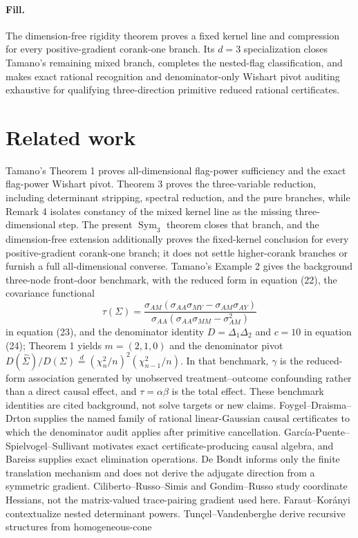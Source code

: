 \documentclass{article}
\begin{document}
\paragraph{Fill.} The dimension-free rigidity theorem proves a fixed kernel line and compression for every positive-gradient corank-one branch. Its \(d=3\) specialization closes Tamano's remaining mixed branch, completes the nested-flag classification, and makes exact rational recognition and denominator-only Wishart pivot auditing exhaustive for qualifying three-direction primitive reduced rational certificates.

\section{Related work}

Tamano's Theorem 1 \cite{Tamano2026SelfNormalizing} proves all-dimensional flag-power sufficiency and the exact flag-power Wishart pivot. Theorem 3 proves the three-variable reduction, including determinant stripping, spectral reduction, and the pure branches, while Remark 4 isolates constancy of the mixed kernel line as the missing three-dimensional step. The present \(\operatorname{Sym}_3\) theorem closes that branch, and the dimension-free extension additionally proves the fixed-kernel conclusion for every positive-gradient corank-one branch; it does not settle higher-corank branches or furnish a full all-dimensional converse. Tamano's Example 2 gives the background three-node front-door benchmark, with the reduced form in equation (22), the covariance functional \[\tau(\Sigma)=\frac{\sigma_{AM}(\sigma_{AA}\sigma_{MY}-\sigma_{AM}\sigma_{AY})}{\sigma_{AA}(\sigma_{AA}\sigma_{MM}-\sigma_{AM}^{2})}\] in equation (23), and the denominator identity \(D=\Delta_1\Delta_2\) and \(c=10\) in equation (24); Theorem 1 yields \(m=(2,1,0)\) and the denominator pivot \(D(\widehat\Sigma)/D(\Sigma)\stackrel{d}{=}(\chi_n^2/n)^2(\chi_{n-1}^2/n)\). In that benchmark, \(\gamma\) is the reduced-form association generated by unobserved treatment--outcome confounding rather than a direct causal effect, and \(\tau=\alpha\beta\) is the total effect. These benchmark identities are cited background, not solve targets or new claims. Foygel--Draisma--Drton \cite{FoygelDraismaDrton2012HalfTrek} supplies the named family of rational linear-Gaussian causal certificates to which the denominator audit applies after primitive cancellation. García-Puente--Spielvogel--Sullivant \cite{GarciaPuenteSpielvogelSullivant2010ComputerAlgebra} motivates exact certificate-producing causal algebra, and Bareiss \cite{Bareiss1968SylvesterIdentity} supplies exact elimination operations. De Bondt \cite{DeBondt2017QuasiTranslations} informs only the finite translation mechanism and does not derive the adjugate direction from a symmetric gradient. Ciliberto--Russo--Simis \cite{CilibertoRussoSimis2008Homaloidal} and Gondim--Russo \cite{GondimRusso2015CubicHessian} study coordinate Hessians, not the matrix-valued trace-pairing gradient used here. Faraut--Korányi \cite{FarautKoranyi1994SymmetricCones} contextualize nested determinant powers. Tunçel--Vandenberghe \cite{TuncelVandenberghe2023HomogeneousCones} derive recursive structures from homogeneous-cone 
\end{document}
